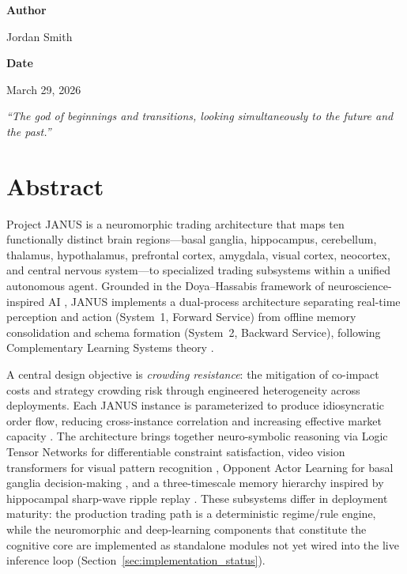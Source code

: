 \documentclass[12pt, a4paper]{article}
\begin{document}
\begin{titlepage}
	\vfill

	{\large\bfseries Author\par}
	{\large Jordan Smith\par}
	\vspace{0.3cm}

	{\large\bfseries Date\par}
	{\large March 29, 2026\par}
	\vspace{0.3cm}

	{\small\itshape ``The god of beginnings and transitions, looking simultaneously to the future and the past.''\/\par} %

\end{titlepage}
\setcounter{page}{2}

\section*{Abstract}

Project JANUS is a neuromorphic trading architecture that maps ten functionally distinct brain regions---basal ganglia, hippocampus, cerebellum, thalamus, hypothalamus, prefrontal cortex, amygdala, visual cortex, neocortex, and central nervous system---to specialized trading subsystems within a unified autonomous agent. Grounded in the Doya--Hassabis framework of neuroscience-inspired AI \citep{doya1999computations, hassabis2017neuroscience}, JANUS implements a dual-process architecture separating real-time perception and action (System~1, Forward Service) from offline memory consolidation and schema formation (System~2, Backward Service), following Complementary Learning Systems theory \citep{mcclelland1995complementary, kumaran2016cls}.

A central design objective is \textit{crowding resistance}: the mitigation of co-impact costs \citep{bucci2020coimpact} and strategy crowding risk \citep{khandani2011quants, stein2009crowding} through engineered heterogeneity across deployments. Each JANUS instance is parameterized to produce idiosyncratic order flow, reducing cross-instance correlation and increasing effective market capacity \citep{demiguel2021crowding, wagner2011diversity}. The architecture brings together neuro-symbolic reasoning via Logic Tensor Networks \citep{badreddine2022logic} for differentiable constraint satisfaction, video vision transformers for visual pattern recognition \citep{arnab2021vivit}, Opponent Actor Learning for basal ganglia decision-making \citep{collins2014opponent, jaskir2023opal}, and a three-timescale memory hierarchy inspired by hippocampal sharp-wave ripple replay \citep{wilson1994replay, masset2025multitimescale}. These subsystems differ in deployment maturity: the production trading path is a deterministic regime/rule engine, while the neuromorphic and deep-learning components that constitute the cognitive core are implemented as standalone modules not yet wired into the live inference loop (Section~\ref{sec:implementation_status}).
\end{document}
